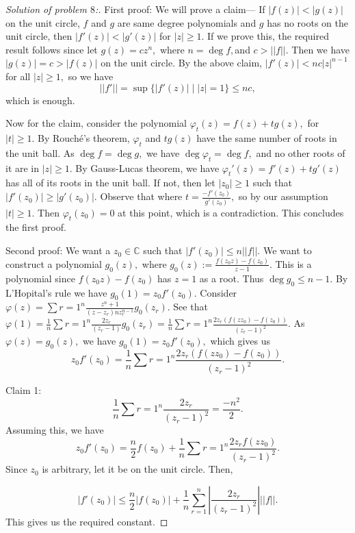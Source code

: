 \documentclass[letterpaper,11pt,twoside]{article}
\theoremstyle{proposition}
\theoremstyle{definition}
\theoremstyle{theorem}
\theoremstyle{definition}
\theoremstyle{definition}
\theoremstyle{definition}
\theoremstyle{lemma}
\theoremstyle{definition}
\theoremstyle{definition}
\theoremstyle{corollary}
\theoremstyle{definition}
\theoremstyle{definition}
\theoremstyle{definition}
\newcommand{\abs}[1]{\left \vert #1 \right \vert}
\newcommand{\norm}[1]{\left \vert \left \vert #1 \right \vert \right \vert}
\renewcommand{\div}{\;\vert\;}
\begin{document}
	\begin{proof}[Solution of problem $8$:]
	First proof: We will prove a claim--- If $\abs{f(z)}< \abs{g(z)}$ on the unit circle, $f$ and $g$ are same degree polynomials and $g$ has no roots on 
	the unit circle, then $\abs{f'(z)}< \abs{g'(z)}$ for $\abs{z} \geq 1.$ If we prove this, the required result follows since let $g(z)= cz^n,$ where $n = 
	\deg f, $and $c > \norm{f}.$ Then we have $\abs{g(z)}=c > \abs{f(z)}$ on the unit circle. By the above claim, $\abs{f'(z)}< nc \abs{z}^{n-1}$ for all 
	$\abs{z} \geq 1,$ so we have $$\norm{f'}= \sup \{\abs{f'(z)} \div \abs{z}=1\} \leq nc,$$ which is enough. 
	
	Now for the claim, consider the polynomial $\varphi_t(z)= f(z)+ tg(z),$ for $\abs{t} \geq 1.$ By Rouch\'{e}'s theorem, $\varphi_t$ and $tg(z)$ have the 
	same number of roots in the unit ball. As $\deg f= \deg g,$ we have $\deg \varphi_t= \deg f,$ and no other roots of it are in $\abs{z} \geq 1.$ 
	By Gauss-Lucas theorem, we have $\varphi_t'(z)= f'(z) + tg'(z)$ has all of its roots in the unit ball. If not, then let $\abs{z_0} \geq 1$ such that 
	$\abs{f'(z_0)} \geq \abs{g'(z_0)}.$ Observe that where $t = \frac{-f'(z_0)}{g'(z_0)},$ so by our assumption $\abs{t} \geq 1.$ Then $\varphi_t(z_0)=0$ at 
	this point, which is a contradiction. This concludes the first proof.
	
	Second proof: We want a $z_0 \in \mathbb{C}$ such that $\abs{f'(z_0)} \leq n \norm{f}.$ We want to construct a polynomial $g_0(z),$ where $g_0(z) := 
	\frac{f(z_0z)-f(z_0)}{z-1}.$ This is a polynomial since $f(z_0z)-f(z_0)$ has $z=1$ as a root. Thus $\deg g_0 \leq n-1.$ By L'Hopital's rule we have 
	$g_0(1)=z_0f'(z_0).$ Consider $\varphi(z)= \sum{r=1}^{n} \frac{z^n+1}{(z-z_r)nz_r^{n-1}}g_0(z_r).$ See that $\varphi(1)= \frac{1}{n} \sum{r=1}^{n} 
	\frac{2z_r}{(z_r-1)}g_0(z_r)= \frac{1}{n} \sum{r=1}^{n} \frac{2z_r (f(zz_0)-f(z_0))}{(z_r-1)^2}.$ As $\varphi(z)=g_0(z),$ we have $g_0(1)= z_0 f'(z_0),$ 
	which gives us $$z_0f'(z_0)= \frac{1}{n} \sum{r=1}^{n} \frac{2z_r (f(zz_0)-f(z_0))}{(z_r-1)^2}.$$ 
	
	Claim 1: $$ \frac{1}{n} \sum{r=1}^{n} \frac{2z_r}{(z_r-1)^2}= \frac{-n^2}{2}.$$ Assuming this, we have $$z_0f'(z_0)= \frac{n}{2}f(z_0)+  \frac{1}{n} 
	\sum{r=1}^{n} \frac{2z_r f(zz_0)}{(z_r-1)^2}.$$ Since $z_0 $ is arbitrary, let it be on the unit circle. Then, 
	
	$$ \abs{f'(z_0)} \leq \frac{n}{2}\abs{f(z_0)}+  \frac{1}{n} \sum_{r=1}^{n} \abs{\frac{2z_r}{(z_r-1)^2}} \norm{f}.$$
	This gives us the required constant. 
	
	
	\end{proof}
\end{document}
